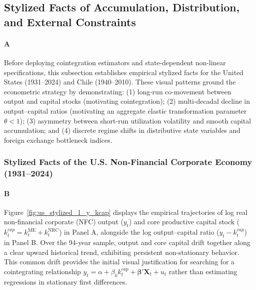 
\subsection{Stylized Facts of Accumulation, Distribution, and External Constraints}

\paragraph{A}
Before deploying cointegration estimators and state-dependent non-linear specifications, this subsection establishes empirical stylized facts for the United States (1931--2024) and Chile (1940--2010). These visual patterns ground the econometric strategy by demonstrating: (1) long-run co-movement between output and capital stocks (motivating cointegration); (2) multi-decadal decline in output--capital ratios (motivating an aggregate elastic transformation parameter $\theta < 1$); (3) asymmetry between short-run utilization volatility and smooth capital accumulation; and (4) discrete regime shifts in distributive state variables and foreign exchange bottleneck indices.

\subsubsection{Stylized Facts of the U.S. Non-Financial Corporate Economy (1931--2024)}

\paragraph{B}
Figure~\ref{fig:us_stylized_1_y_kcap} displays the empirical trajectories of log real non-financial corporate (NFC) output ($y_t$) and core productive capital stock ($k_t^{cap} = k_t^{\text{ME}} + k_t^{\text{NRC}}$) in Panel A, alongside the log output--capital ratio ($y_t - k_t^{cap}$) in Panel B. Over the 94-year sample, output and core capital drift together along a clear upward historical trend, exhibiting persistent non-stationary behavior. This common drift provides the initial visual justification for searching for a cointegrating relationship $y_t = \alpha + \beta_k k_t^{cap} + \boldsymbol{\beta}'\mathbf{X}_t + u_t$ rather than estimating regressions in stationary first differences.

